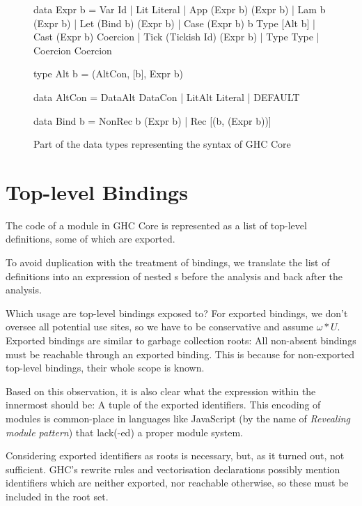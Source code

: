 \begin{figure}[h]
  \begin{haskellcode}
    data Expr b
      = Var      Id
      | Lit      Literal
      | App      (Expr b) (Expr b)
      | Lam      b (Expr b)
      | Let      (Bind b) (Expr b)
      | Case     (Expr b) b Type [Alt b]
      | Cast     (Expr b) Coercion
      | Tick     (Tickish Id) (Expr b)
      | Type     Type
      | Coercion Coercion

    type Alt b = (AltCon, [b], Expr b)

    data AltCon
      = DataAlt DataCon
      | LitAlt  Literal
      | DEFAULT 

    data Bind b 
      = NonRec b (Expr b)
      | Rec [(b, (Expr b))]
  \end{haskellcode}
  \caption{Part of the data types representing the syntax of GHC Core}
  \label{fig:core}
\end{figure}

\section{Top-level Bindings}\label{sec:toplvl}

The code of a module in GHC Core is represented as a list of top-level definitions, some of which are exported.

To avoid duplication with the treatment of  bindings, we translate the list of definitions into an expression of nested s before the analysis and back after the analysis.

Which usage are top-level bindings exposed to? 
For exported bindings, we don't oversee all potential use sites, so we have to be conservative and assume $\omega*U$. 
Exported bindings are similar to garbage collection roots: 
All non-absent bindings must be reachable through an exported binding. 
This is because for non-exported top-level bindings, their whole scope is known.

Based on this observation, it is also clear what the expression within the innermost  should be: A tuple of the exported identifiers.
This encoding of modules is common-place in languages like JavaScript (by the name of \emph{Revealing module pattern}) that lack(-ed) a proper module system.

Considering exported identifiers as roots is necessary, but, as it turned out, not sufficient.
GHC's rewrite rules and vectorisation declarations possibly mention identifiers which are neither exported, nor reachable otherwise, so these must be included in the root set.

